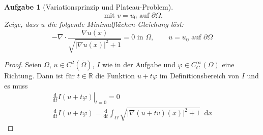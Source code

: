 \documentclass{scrartcl}
\newcommand{\abs}[1]{\left\lvert #1 \right\rvert}
\newcommand{\restr}[2]{\left. #1 \right|_{#2}}
\newcommand{\intd}{\mathop{} \mathrm{d}}
\newcommand{\ableitung}[1]{
  \frac
    {\mathrm{d}}
    {\mathrm{d} #1}
  }
\newcommand{\Rand}[1]{\partial #1}
\newcommand{\reals}{\mathbb{R}}
\newcommand{\closure}[1]{\overline{#1}}
\newtheorem {problem} {Aufgabe}
\begin{document}
\begin{problem}[Variationsprinzip und Plateau-Problem]
\begin{equation}
    \text{ mit } v = u_0 \text{ auf } \Rand {\Omega}.
  \end{equation}
  Zeige, dass $u$ die folgende Minimalflächen-Gleichung löst:
  \begin{equation}
    - \nabla
    \cdot
    \frac
      {\nabla u(x)}
      {\sqrt{\abs{\nabla u(x)}^2 + 1}}
    = 0 \text{ in } \Omega, \qquad u = u_0 \text{ auf } \Rand{\Omega}
  \end{equation}

  \end{problem}

  \begin{proof}
    Seien $\Omega$, $u \in C^2(\closure{\Omega})$, $I$ wie in der Aufgabe
    und $\varphi \in C_C^{\infty}(\Omega)$ eine Richtung.
    Dann ist für $t \in \reals$ die Funktion $u + t\varphi$ im Definitionsbereich von $I$ und es muss
    \begin{align}
      \restr {\ableitung{t} I(u + t\varphi)}{t = 0} = 0 \\
      \ableitung{t} I(u + t\varphi) =
      \ableitung{t} \int_{\Omega} \sqrt{
        \abs{
          \nabla(u+tv) (x)
        }^2 + 1
      } \intd x
    \end{align}
  \end{proof}
\end{document}
